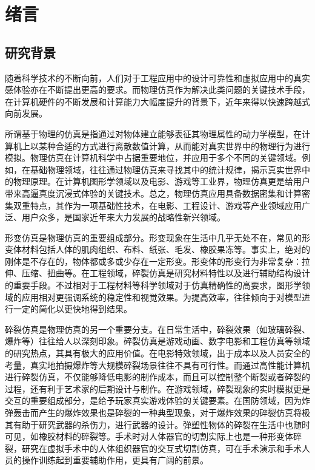 \chapter{绪言}
\label{chap1_introduction}
\section{研究背景}
随着科学技术的不断向前，人们对于工程应用中的设计可靠性和虚拟应用中的真实感体验亦在不断提出更高的要求。而物理仿真作为解决此类问题的关键技术手段，在计算机硬件的不断发展和计算能力大幅度提升的背景下，近年来得以快速跨越式向前发展。

所谓基于物理的仿真是指通过对物体建立能够表征其物理属性的动力学模型，在计算机上以某种合适的方式进行离散数值计算，从而能对真实世界中的物理行为进行模拟。物理仿真在计算机科学中占据重要地位，并应用于多个不同的关键领域。例如，在基础物理领域，往往通过物理仿真来寻找其中的统计规律，揭示真实世界中的物理原理。在计算机图形学领域以及电影、游戏等工业界，物理仿真更是给用户带来高逼真度沉浸式体验的关键技术。总之，物理仿真应用具备数据密集和计算密集双重特点，其作为一项基础性技术，在电影、工程设计、游戏等产业领域应用广泛、用户众多，是国家近年来大力发展的战略性新兴领域。

形变仿真是物理仿真的重要组成部分。形变现象在生活中几乎无处不在，常见的形变体材料包括人体的肌肉组织、布料、纸张、毛发、橡胶果冻等。事实上，绝对的刚体是不存在的，物体都或多或少存在一定形变。形变体的形变行为非常复杂：拉伸、压缩、扭曲等。在工程领域，碎裂仿真是研究材料特性以及进行辅助结构设计的重要手段。不过相对于工程材料等科学领域对于仿真精确性的高要求，图形学领域的应用相对更强调系统的稳定性和视觉效果。为提高效率，往往倾向于对模型进行一定的简化以更快地得到结果。

碎裂仿真是物理仿真的另一个重要分支。在日常生活中，碎裂效果（如玻璃碎裂、爆炸等）往往给人以深刻印象。碎裂仿真是游戏动画、数字电影和工程仿真等领域的研究热点，其具有极大的应用价值。在电影特效领域，出于成本以及人员安全的考量，真实地拍摄爆炸等大规模碎裂场景往往不具有可行性。而通过高性能计算机进行碎裂仿真，不仅能够降低电影的制作成本，而且可以控制整个断裂或者碎裂的过程，还有利于艺术家的后期设计与制作。在游戏领域，碎裂现象的实时模拟更是交互的重要组成部分，是给予玩家真实游戏体验的关键要素。在国防领域，因为炸弹轰击而产生的爆炸效果也是碎裂的一种典型现象，对于爆炸效果的碎裂仿真将极其有助于研究武器的杀伤力，进行武器的设计。弹塑性物体的碎裂在生活中也随时可见，如橡胶材料的碎裂等。手术时对人体器官的切割实际上也是一种形变体碎裂，研究在虚拟手术中的人体组织器官的交互式切割仿真，可在手术演示和手术人员的操作训练起到重要辅助作用，更具有广阔的前景。

